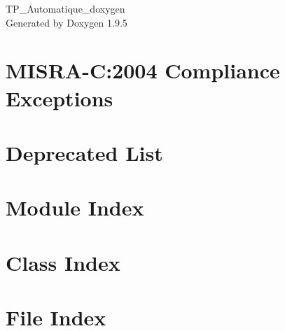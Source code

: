 \documentclass[twoside]{book}
\newcommand{\+}{\discretionary{\mbox{\scriptsize$\hookleftarrow$}}{}{}}
\newcommand{\clearemptydoublepage}{%
    \newpage{\pagestyle{empty}\cleardoublepage}%
  }
\begin{document}
  \raggedbottom
    \hypersetup{pageanchor=false,
                bookmarksnumbered=true,
                pdfencoding=unicode
               }
  \begin{titlepage}
  \vspace*{7cm}
  \begin{center}%
  {\Large TP\+\_\+\+Automatique\+\_\+doxygen}\\
  \vspace*{1cm}
  {\large Generated by Doxygen 1.9.5}\\
  \end{center}
  \end{titlepage}
  \clearemptydoublepage
  \tableofcontents
  \clearemptydoublepage
  \hypersetup{pageanchor=true}
\chapter{MISRA-\/C\+:2004 Compliance Exceptions}
\label{_c_m_s_i_s__m_i_s_r_a__exceptions}

\chapter{Deprecated List}
\label{deprecated}

\chapter{Module Index}

\chapter{Class Index}

\chapter{File Index}

\end{document}

